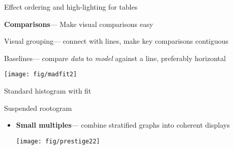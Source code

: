 \begin{frame}[t]
  \begin{itemize*}
	\item Effect ordering and high-lighting for tables \citep{Friendly:00:mdarray}
	
  \end{itemize*}	
\end{frame}

\begin{frame}
  \begin{itemize*}
	  \item {\bfseries Comparisons}--- Make visual comparisons easy
    	\begin{itemize*}
		\item Visual grouping--- connect with lines, make key comparisons contiguous
		\item Baselines--- compare \emph{data} to \emph{model} against a line, preferably horizontal
		\end{itemize*}
  \end{itemize*}
	  \vspace{1ex}
	  \begin{center}
	  \texttt{[image: fig/madfit2]} \\
      \begin{minipage}{.45\linewidth}
      \centering Standard histogram with fit  
      \end{minipage}
		\hfill 
      \begin{minipage}{.45\linewidth}
      \centering Suspended rootogram 
      \end{minipage}
	  \end{center}
\end{frame}

\begin{frame}

  \begin{itemize}
	  \item {\bfseries Small multiples}--- combine stratified graphs into coherent displays \citep{Tufte:83}
	  \vspace{1ex}
	  \begin{center}
	  \texttt{[image: fig/prestige22]}
	  \end{center}
  \end{itemize}
\end{frame}

